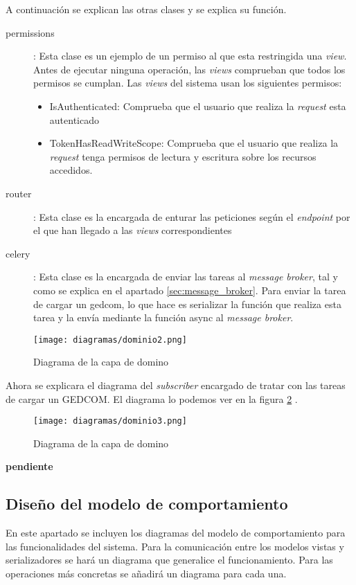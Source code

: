 A continuación se explican las otras clases y se explica su función.
\begin{description}
\item[permissions]: Esta clase es un ejemplo de un permiso al que esta restringida una \textit{view}. Antes de ejecutar ninguna operación, las \textit{views} comprueban que todos los permisos se cumplan. Las \textit{views} del sistema usan los siguientes permisos:
\begin{itemize}
	\item IsAuthenticated: Comprueba que el usuario que realiza la \textit{request} esta autenticado
	\item TokenHasReadWriteScope: Comprueba que el usuario que realiza la \textit{request} tenga permisos de lectura y escritura sobre los recursos accedidos.
\end{itemize}
\item[router]: Esta clase es la encargada de enturar las peticiones según el \textit{endpoint} por el que han llegado a las \textit{views} correspondientes
\item[celery]: Esta clase es la encargada de enviar las tareas al \textit{message broker}, tal y como se explica en el apartado \ref{sec:message_broker}. Para enviar la tarea de cargar un gedcom, lo que hace es serializar la función que realiza esta tarea y la envía mediante la función async al \textit{message broker}.
\end{description}

\begin{figure}[ht!]
\center
\texttt{[image: diagramas/dominio2.png]}
\caption{Diagrama de la capa de domino}
\label{fig:domino}
\end{figure}

Ahora se explicara el diagrama del \textit{subscriber} encargado de tratar con las tareas de cargar un GEDCOM.
El diagrama lo podemos ver en la figura \ref{fig:domino2} .

\begin{figure}[ht!]
	\center
	\texttt{[image: diagramas/dominio3.png]}
	\caption{Diagrama de la capa de domino}
	\label{fig:domino2}
\end{figure}

\textbf{pendiente}
\newpage
\subsection{Diseño del modelo de comportamiento}
En este apartado se incluyen los diagramas del modelo de comportamiento para las funcionalidades del sistema. Para la comunicación entre los modelos vistas y serializadores se hará un diagrama que generalice el funcionamiento. Para las operaciones más concretas se añadirá un diagrama para cada una.

